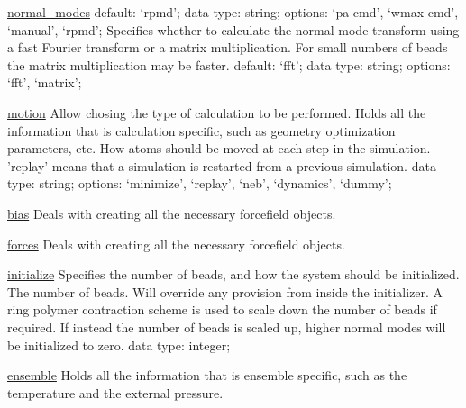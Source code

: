 \begin{ipifield}{}
\begin{ipifield}{\hyperref[NORMALMODES]{normal\_modes}}
{{default: `rpmd'; data type: string; options: `pa-cmd', `wmax-cmd', `manual', `rpmd'; }%
%
{Specifies whether to calculate the normal mode transform using a fast Fourier transform or a matrix multiplication. For small numbers of beads the matrix multiplication may be faster.}%
{default: `fft'; data type: string; options: `fft', `matrix'; }%
}
\end{ipifield}
\begin{ipifield}{\hyperref[MOTION]{motion}}%
{Allow chosing the type of calculation to be performed. Holds all the information that is calculation specific, such as geometry optimization parameters, etc.}%
{}%
{%
{How atoms should be moved at each step in the simulation. 'replay' means that a simulation is restarted from a previous simulation.}%
{data type: string; options: `minimize', `replay', `neb', `dynamics', `dummy'; }%
}
\end{ipifield}
\begin{ipifield}{\hyperref[FORCES]{bias}}%
{Deals with creating all the necessary forcefield objects.}%
{}%
{}
\end{ipifield}
\begin{ipifield}{\hyperref[FORCES]{forces}}%
{Deals with creating all the necessary forcefield objects.}%
{}%
{}
\end{ipifield}
\begin{ipifield}{\hyperref[INITIALIZER]{initialize}}%
{Specifies the number of beads, and how the system should be initialized.}%
{}%
{%
{The number of beads. Will override any provision from inside the initializer. A ring polymer contraction scheme is used to scale down the number of beads if required. If instead the number of beads is scaled up, higher normal modes will be initialized to zero.}%
{data type: integer; }%
}
\end{ipifield}
\begin{ipifield}{\hyperref[ENSEMBLE]{ensemble}}%
{Holds all the information that is ensemble specific, such as the temperature and the external pressure.}%
{}%
{}
\end{ipifield}
\end{ipifield}
